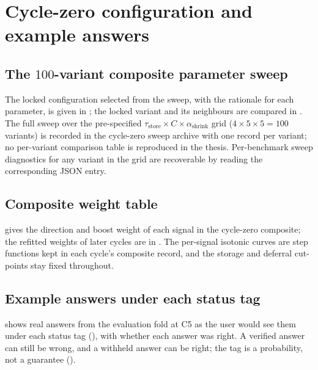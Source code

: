 
\chapter{Cycle-zero configuration and example answers}
\label{app:cycle0-catalog}


\section{The $100$-variant composite parameter sweep}
\label{app:sweep-full}

The locked configuration selected from the sweep, with the rationale for each parameter, is given in ; the locked variant and its neighbours are compared in . The full sweep over the pre-specified $\tau_{\text{store}} \times C \times \alpha_{\text{shrink}}$ grid ($4 \times 5 \times 5 = 100$ variants) is recorded in the cycle-zero sweep archive with one record per variant; no per-variant comparison table is reproduced in the thesis. Per-benchmark sweep diagnostics for any variant in the grid are recoverable by reading the corresponding JSON entry.



\section{Composite weight table}
\label{app:composite-weights}

 gives the direction and boost weight of each signal in the cycle-zero composite; the refitted weights of later cycles are in . The per-signal isotonic curves are step functions kept in each cycle's composite record, and the storage and deferral cut-points stay fixed throughout.



\section{Example answers under each status tag}
\label{app:production-envelope}

 shows real answers from the evaluation fold at C5 as the user would see them under each status tag (), with whether each answer was right. A verified answer can still be wrong, and a withheld answer can be right; the tag is a probability, not a guarantee ().


